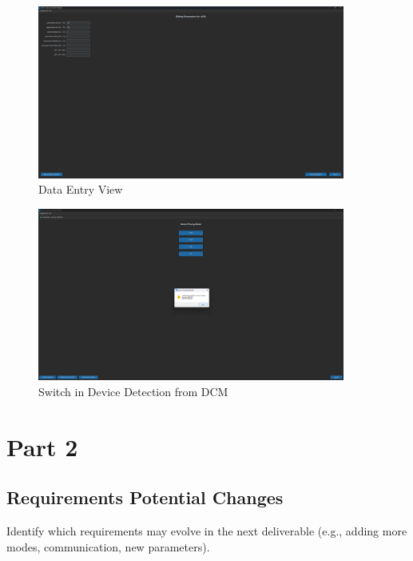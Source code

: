 \documentclass{article}
\begin{document}
\begin{tcolorbox}
    \begin{figure}[H]
        \centering
        \includegraphics[width=0.9\textwidth]{genparams.png}
        \caption{Data Entry View}
    \end{figure}
\end{tcolorbox}

\begin{tcolorbox}
    \begin{figure}[H]
        \centering
        \includegraphics[width=0.9\textwidth]{switchindevice.png}
        \caption{Switch in Device Detection from DCM}
    \end{figure}
\end{tcolorbox}

\newpage
\section{Part 2}

\subsection{Requirements Potential Changes}
Identify which requirements may evolve in the next deliverable (e.g., adding more modes, communication, new parameters).
\end{document}
